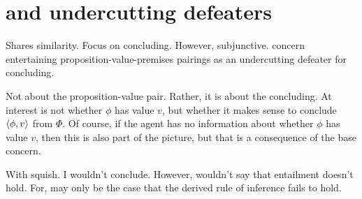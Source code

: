 \section{ and undercutting defeaters}

\begin{note}
  Shares similarity.
  Focus on concluding.
  However, subjunctive.
   concern entertaining proposition-value-premises pairings as an undercutting defeater for concluding.
\end{note}

\begin{note}
  Not about the proposition-value pair.
  Rather, it is about the concluding.
  At interest is not whether \(\phi\) has value \(v\), but whether it makes sense to conclude \(\langle \phi, v \rangle\) from \(\Phi\).
  Of course, if the agent has no information about whether \(\phi\) has value \(v\), then this is also part of the picture, but that is a consequence of the base concern.

  With squish.
  I wouldn't conclude.
  However, wouldn't say that entailment doesn't hold.
  For, may only be the case that the derived rule of inference fails to hold.
\end{note}

